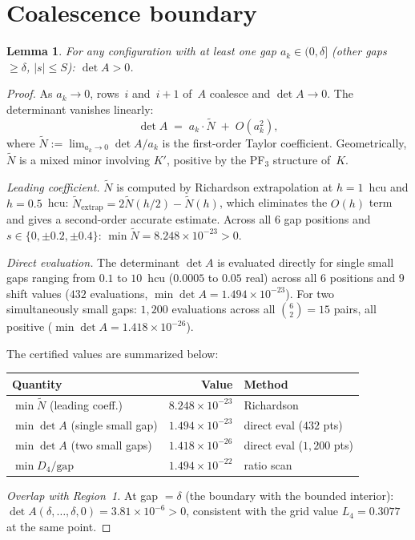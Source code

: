 \documentclass[11pt,a4paper]{amsart}
\newtheorem{lemma}[theorem]{Lemma}
\theoremstyle{definition}
\theoremstyle{remark}
\newcommand{\Ntilde}{\tilde{N}}
\begin{document}
\section{Coalescence boundary}\label{sec:coalescence}

\begin{lemma}\label{lem:coal}
For any configuration with at least one gap
$a_k \in (0, \delta]$ (other gaps $\ge \delta$, $|s| \le S$):
$\det A > 0$.
\end{lemma}
\begin{proof}
As $a_k \to 0$, rows~$i$ and~$i{+}1$ of~$A$ coalesce
and $\det A \to 0$.
The determinant vanishes linearly:
\begin{equation}\label{eq:coal-expansion}
  \det A \;=\; a_k \cdot \Ntilde \;+\; O(a_k^2),
\end{equation}
where $\Ntilde := \lim_{a_k \to 0} \det A / a_k$ is the
first-order Taylor coefficient.
Geometrically, $\Ntilde$ is a mixed minor involving $K'$,
positive by the PF$_3$ structure of~$K$.

\emph{Leading coefficient.}
$\Ntilde$ is computed by Richardson extrapolation at
$h = 1$~hcu and $h = 0.5$~hcu:
$\Ntilde_{\text{extrap}} = 2\Ntilde(h/2) - \Ntilde(h)$,
which eliminates the $O(h)$ term and gives a second-order
accurate estimate.
Across all $6$ gap positions and
$s \in \{0, \pm 0.2, \pm 0.4\}$:
$\min \Ntilde = 8.248 \times 10^{-23} > 0$.

\emph{Direct evaluation.}
The determinant $\det A$ is evaluated directly for single
small gaps ranging from $0.1$ to $10$~hcu
($0.0005$ to $0.05$ real)
across all $6$ positions and $9$ shift values
($432$ evaluations, $\min \det A = 1.494\times 10^{-23}$).
For two simultaneously small gaps:
$1{,}200$ evaluations across all $\binom{6}{2} = 15$ pairs,
all positive ($\min \det A = 1.418\times 10^{-26}$).

The certified values are summarized below:
\begin{center}
\begin{tabular}{@{}lrl@{}}
\toprule
Quantity & Value & Method \\
\midrule
$\min \Ntilde$ (leading coeff.) & $8.248\times 10^{-23}$ & Richardson \\
$\min \det A$ (single small gap) & $1.494\times 10^{-23}$ & direct eval ($432$ pts) \\
$\min \det A$ (two small gaps) & $1.418\times 10^{-26}$ & direct eval ($1{,}200$ pts) \\
$\min D_4/\text{gap}$ & $1.494\times 10^{-22}$ & ratio scan \\
\bottomrule
\end{tabular}
\end{center}

\emph{Overlap with Region~1.}
At gap $= \delta$
(the boundary with the bounded interior):
$\det A(\delta,\ldots,\delta,0) = 3.81\times 10^{-6} > 0$,
consistent with the grid value $L_4 = 0.3077$ at the same point.
\end{proof}
\end{document}
